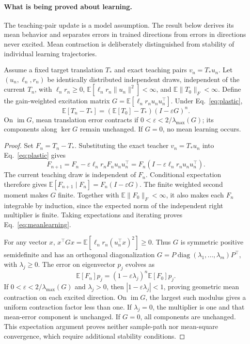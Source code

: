 \documentclass[submission,nolinenumbers]{esj}
\DeclareMathOperator{\im}{im}
\DeclareMathOperator{\Ker}{ker}
\begin{document}
\paragraph{What is being proved about learning.} The teaching-pair update is a model assumption. The result below derives its mean behavior and separates errors in trained directions from errors in directions never excited. Mean contraction is deliberately distinguished from stability of individual learning trajectories.

\begin{proposition}\label{prop:learning}
Assume a fixed target translation $T_*$ and exact teaching pairs $v_n=T_*u_n$. Let $(u_n,\ell_n,r_n)$ be identically distributed independent draws, independent of the current $T_n$, with $\ell_n r_n\ge0$, $\mathbb E[\ell_n r_n\|u_n\|^2]<\infty$, and $\mathbb E\|T_0\|_F<\infty$. Define the gain-weighted excitation matrix $G=\mathbb E[\ell_n r_nu_nu_n^\top]$. Under Eq.~\eqref{eq:plastic},
\begin{equation}
\mathbb E[T_n-T_*]=(\mathbb E[T_0]-T_*)(I-\varepsilon G)^n.
\label{eq:meanlearning}
\end{equation}
On $\im G$, mean translation error contracts if $0<\varepsilon<2/\lambda_{\max}(G)$; its components along $\Ker G$ remain unchanged. If $G=0$, no mean learning occurs.
\end{proposition}
\begin{proof}
Set $F_n=T_n-T_*$. Substituting the exact teacher $v_n=T_*u_n$ into Eq.~\eqref{eq:plastic} gives
\[
F_{n+1}=F_n-\varepsilon\ell_nr_nF_nu_nu_n^\top
=F_n(I-\varepsilon\ell_nr_nu_nu_n^\top).
\]
The current teaching draw is independent of $F_n$. Conditional expectation therefore gives $\mathbb E[F_{n+1}\mid F_n]=F_n(I-\varepsilon G)$. The finite weighted second moment makes $G$ finite. Together with $\mathbb E\|F_0\|_F<\infty$, it also makes each $F_n$ integrable by induction, since the expected norm of the independent right multiplier is finite. Taking expectations and iterating proves Eq.~\eqref{eq:meanlearning}.

For any vector $x$, $x^\top Gx=\mathbb E[\ell_nr_n(u_n^\top x)^2]\ge0$. Thus $G$ is symmetric positive semidefinite and has an orthogonal diagonalization $G=P\operatorname{diag}(\lambda_1,\ldots,\lambda_m)P^\top$, with $\lambda_j\ge0$. The error on eigenvector $p_j$ evolves as
\[
\mathbb E[F_n]p_j=(1-\varepsilon\lambda_j)^n\mathbb E[F_0]p_j.
\]
If $0<\varepsilon<2/\lambda_{\max}(G)$ and $\lambda_j>0$, then $|1-\varepsilon\lambda_j|<1$, proving geometric mean contraction on each excited direction. On $\im G$, the largest such modulus gives a uniform contraction factor less than one. If $\lambda_j=0$, the multiplier is one and that mean-error component is unchanged. If $G=0$, all components are unchanged. This expectation argument proves neither sample-path nor mean-square convergence, which require additional stability conditions.
\end{proof}
\end{document}
